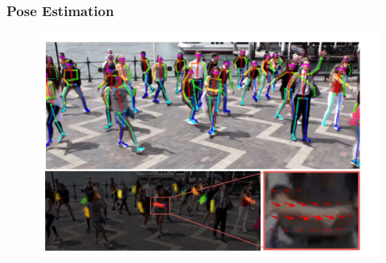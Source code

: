 \documentclass{beamer}
\begin{document}
\begin{frame}
\frametitle{Pose Estimation}

\begin{figure}
    \centering
    \includegraphics[width=1\linewidth]{p4.png}
    
    
\end{figure}

\end{frame}
\end{document}
